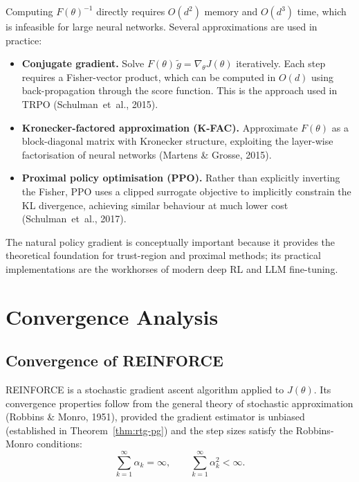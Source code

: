 Computing $F(\theta)^{-1}$ directly requires $O(d^2)$ memory and $O(d^3)$ time, which is infeasible for large neural networks.  Several approximations are used in practice:
\begin{itemize}[leftmargin=*]
\item \textbf{Conjugate gradient.}  Solve $F(\theta)\, \tilde g = \nabla_\theta J(\theta)$ iteratively.  Each step requires a Fisher-vector product, which can be computed in $O(d)$ using back-propagation through the score function.  This is the approach used in TRPO (Schulman~et~al., 2015).

\item \textbf{Kronecker-factored approximation (K-FAC).}  Approximate $F(\theta)$ as a block-diagonal matrix with Kronecker structure, exploiting the layer-wise factorisation of neural networks (Martens \& Grosse, 2015).

\item \textbf{Proximal policy optimisation (PPO).}  Rather than explicitly inverting the Fisher, PPO uses a clipped surrogate objective to implicitly constrain the KL divergence, achieving similar behaviour at much lower cost (Schulman~et~al., 2017).
\end{itemize}
The natural policy gradient is conceptually important because it provides the theoretical foundation for trust-region and proximal methods; its practical implementations are the workhorses of modern deep RL and LLM fine-tuning.

\section{Convergence Analysis}
\label{sec:pg-convergence}


\subsection{Convergence of REINFORCE}

REINFORCE is a stochastic gradient ascent algorithm applied to $J(\theta)$.  Its convergence properties follow from the general theory of stochastic approximation (Robbins \& Monro, 1951), provided the gradient estimator is unbiased (established in Theorem~\ref{thm:rtg-pg}) and the step sizes satisfy the Robbins-Monro conditions:
\begin{equation}
\label{eq:rm-conditions}
\sum_{k=1}^\infty \alpha_k = \infty, \qquad \sum_{k=1}^\infty \alpha_k^2 < \infty.
\end{equation}

